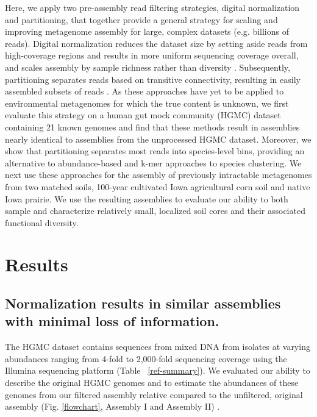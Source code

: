 \documentclass{pnastwo}
\begin{document}
\begin{article}
Here, we apply two pre-assembly read filtering strategies, digital
normalization and partitioning, that together provide a general strategy for scaling and
improving metagenome assembly for large, complex datasets (e.g. billions of reads). 
Digital normalization reduces the dataset size by setting aside reads from high-coverage
regions and results in more uniform sequencing coverage overall, and scales assembly by sample richness rather than diversity \cite{browndiginorm}. Subsequently, partitioning separates reads based
on transitive connectivity, resulting in easily assembled subsets of reads \cite{Pell:2012cq}.
As these approaches have yet to be applied to environmental metagenomes for which the true content is unknown,
we first evaluate this strategy on a human gut mock community (HGMC) dataset containing 21 known genomes and find that these
methods result in assemblies nearly identical to assemblies from the unprocessed HGMC
dataset.  Moreover, we show that partitioning separates most reads into
species-level bins, providing an alternative to abundance-based and k-mer
approaches to species clustering.  We next use these approaches for the assembly of previously intractable
metagenomes from two matched soils, 100-year cultivated Iowa agricultural corn soil
and native Iowa prairie.  We use the resulting assemblies to evaluate our ability to both sample and characterize relatively small, localized soil cores and their associated functional diversity.

\section*{Results} \subsection*{Normalization results in similar assemblies with minimal loss of information.} 
The HGMC dataset contains sequences from mixed DNA from isolates at varying abundances ranging from 4-fold to
2,000-fold sequencing coverage using the Illumina sequencing platform (Table ~\ref{ref-summary}). We evaluated our ability to describe the original HGMC genomes and to estimate the abundances of these genomes from our filtered assembly relative compared to the unfiltered, original assembly (Fig. \ref{flowchart}, Assembly I and Assembly II) .  


\end{article}
\end{document}
